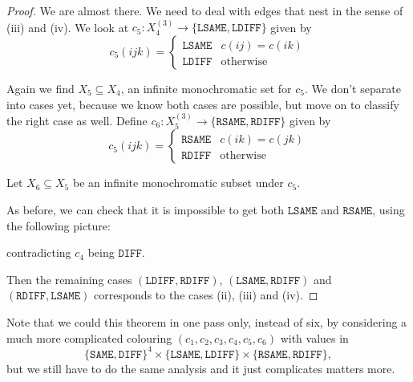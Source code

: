 \documentclass[a4paper]{article}
\begin{document}
\begin{proof}
  We are almost there. We need to deal with edges that nest in the sense of (iii) and (iv). We look at $c_5: X_4^{(3)} \to \{\mathtt{LSAME}, \mathtt{LDIFF}\}$ given by
  \[
    c_5(ijk) =
    \begin{cases}
      \mathtt{LSAME} & c(ij) = c(ik)\\
      \mathtt{LDIFF} & \mathrm{otherwise}
    \end{cases}
  \]
   \begin{center}
  \end{center}
  Again we find $X_5 \subseteq X_4$, an infinite monochromatic set for $c_5$. We don't separate into cases yet, because we know both cases are possible, but move on to classify the right case as well. Define $c_6: X_5^{(3)} \to \{\mathtt{RSAME}, \mathtt{RDIFF}\}$ given by
  \[
    c_5(ijk) =
    \begin{cases}
      \mathtt{RSAME} & c(ik) = c(jk)\\
      \mathtt{RDIFF} & \mathrm{otherwise}
    \end{cases}
  \]
   \begin{center}
  \end{center}
  Let $X_6 \subseteq X_5$ be an infinite monochromatic subset under $c_5$.

  As before, we can check that it is impossible to get both $\mathtt{LSAME}$ and $\mathtt{RSAME}$, using the following picture:
  \begin{center}
  \end{center}
  contradicting $c_4$ being $\mathtt{DIFF}$.

  Then the remaining cases $(\mathtt{LDIFF}, \mathtt{RDIFF})$, $(\mathtt{LSAME}, \mathtt{RDIFF})$ and $(\mathtt{RDIFF}, \mathtt{LSAME})$ corresponds to the cases (ii), (iii) and (iv).
\end{proof}
Note that we could this theorem in one pass only, instead of six, by considering a much more complicated colouring $(c_1, c_2, c_3, c_4, c_5, c_6)$ with values in
\[
  \{\mathtt{SAME}, \mathtt{DIFF}\}^4 \times \{\mathtt{LSAME}, \mathtt{LDIFF}\} \times \{\mathtt{RSAME}, \mathtt{RDIFF}\},
\]
but we still have to do the same analysis and it just complicates matters more.
\end{document}
